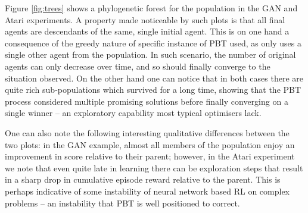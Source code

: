 Figure \ref{fig:trees} shows a phylogenetic forest for the population in the GAN and Atari experiments. A property made noticeable by such plots is that all final agents are descendants of the same, single initial agent. This is on one hand a consequence of the greedy nature of specific instance of PBT used, as \pbtexploit only uses a single other agent from the population. In such scenario, the number of original agents can only decrease over time, and so should finally converge to the situation observed. On the other hand one can notice that in both cases there are quite rich sub-populations which survived for a long time, showing that the PBT process considered multiple promising solutions before finally converging on a single winner -- an exploratory capability most typical optimisers lack.

One can also note the following interesting qualitative differences between the two plots: in the GAN example, almost all members of the population enjoy an improvement in score relative to their parent; however, in the Atari experiment we note that even quite late in learning there can be exploration steps that result in a sharp drop in cumulative episode reward relative to the parent. This is perhaps indicative of some instability of neural network based RL on complex problems -- an instability that PBT is well positioned to correct.

